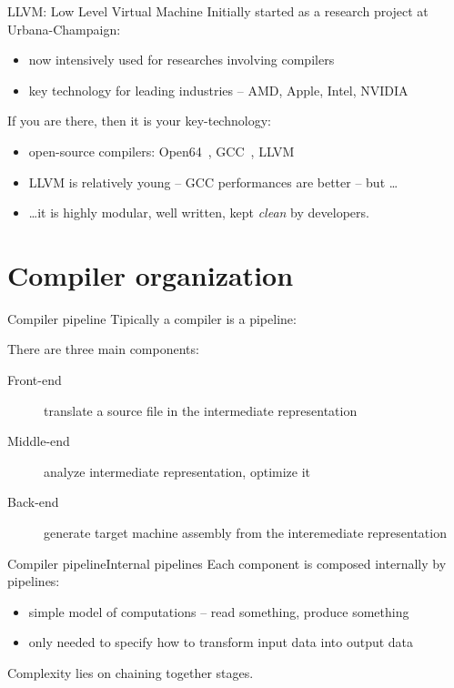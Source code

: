 \documentclass[10pt,mathserif]{beamer}
\begin{document}
\begin{frame}{LLVM: Low Level Virtual Machine}
Initially started as a research project at Urbana-Champaign:

\begin{itemize}
\item now intensively used for \alert{researches} involving compilers
\item key technology for \alert{leading industries} -- AMD, Apple, Intel,
      NVIDIA
\end{itemize}

\vfill
If you are there, then it is \alert{your key-technology}:

\begin{itemize}
\item open-source compilers: Open64~\cite{LOCAL:www/open64},
      GCC~\cite{LOCAL:www/gcc}, LLVM~\cite{LOCAL:www/llvm}
\item LLVM is relatively \alert{young} -- GCC performances are  better -- but \ldots
\item \ldots it is highly modular, well written, kept \emph{clean} by developers.
\end{itemize}
\end{frame}

\section{Compiler organization}
\begin{frame}{Compiler pipeline}
Tipically a compiler is a \alert{pipeline}:

\begin{figure}
\centering

\end{figure}

\vfill
There are three main components:
\begin{description}
\item[Front-end] \alert{translate} a source file in the \alert{intermediate representation}
\item[Middle-end] \alert{analyze} intermediate representation, \alert{optimize}
                  it
\item[Back-end] \alert{generate} target machine assembly from the interemediate
                representation
\end{description}
\end{frame}

\begin{frame}{Compiler pipeline}{Internal pipelines}
Each component is composed internally by pipelines:

\begin{itemize}
\item simple model of computations -- \alert{read} something, \alert{produce}
      something
\item only needed to specify \alert{how to transform} input data into output
      data
\end{itemize}

Complexity lies on \alert{chaining} together stages.
\end{frame}
\end{document}

